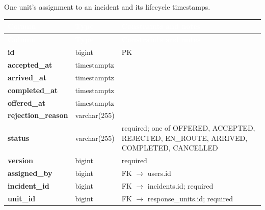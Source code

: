 \subsection*{}
One unit’s assignment to an incident and its lifecycle timestamps.\par\vspace{2pt}
{\tabfont\rowband
\begin{longtable}{@{}>{\raggedright\arraybackslash}p{}>{\raggedright\arraybackslash}p{}>{\raggedright\arraybackslash}p{}@{}}
\rowcolor{najdanavy}\textcolor{white}{\sffamily\bfseries\small Column} & \textcolor{white}{\sffamily\bfseries\small Type} & \textcolor{white}{\sffamily\bfseries\small Constraints and notes}\\
\endfirsthead
\rowcolor{najdanavy}\textcolor{white}{\sffamily\bfseries\small Column} & \textcolor{white}{\sffamily\bfseries\small Type} & \textcolor{white}{\sffamily\bfseries\small Constraints and notes}\\
\endhead
\bottomrule\endlastfoot
\textbf{id} & bigint & PK\\
\textbf{accepted\_\allowbreak{}at} & timestamptz & \\
\textbf{arrived\_\allowbreak{}at} & timestamptz & \\
\textbf{completed\_\allowbreak{}at} & timestamptz & \\
\textbf{offered\_\allowbreak{}at} & timestamptz & \\
\textbf{rejection\_\allowbreak{}reason} & varchar(255) & \\
\textbf{status} & varchar(255) & required; one of OFFERED, ACCEPTED, REJECTED, EN\_\allowbreak{}ROUTE, ARRIVED, COMPLETED, CANCELLED\\
\textbf{version} & bigint & required\\
\textbf{assigned\_\allowbreak{}by} & bigint & FK $\rightarrow$ users.id\\
\textbf{incident\_\allowbreak{}id} & bigint & FK $\rightarrow$ incidents.id; required\\
\textbf{unit\_\allowbreak{}id} & bigint & FK $\rightarrow$ response\_\allowbreak{}units.id; required\\
\end{longtable}}

